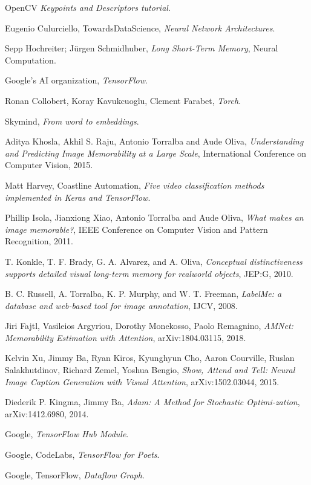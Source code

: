 \begin{thebibliography}{}
	OpenCV
	\emph{Keypoints and Descriptors tutorial}.


	Eugenio Culurciello, TowardsDataScience,
	\emph{Neural Network Architectures}.

	Sepp Hochreiter; Jürgen Schmidhuber,
	\emph{Long Short-Term Memory},
	Neural Computation.

	Google’s AI organization,
	\emph{TensorFlow}.

	Ronan Collobert, Koray Kavukcuoglu, Clement Farabet,
    \emph{Torch}.

	Skymind,
    \emph{From word to embeddings}.


	Aditya Khosla, Akhil S. Raju, Antonio Torralba and Aude Oliva,
	\emph{Understanding and Predicting Image Memorability at a Large Scale},
	International Conference on Computer Vision,
	2015.

	Matt Harvey, Coastline Automation,
	\emph{Five video classification methods implemented in Keras and TensorFlow}.

	Phillip Isola, Jianxiong Xiao, Antonio Torralba and Aude Oliva,
	\emph{What makes an image memorable?},
	IEEE Conference on Computer Vision and Pattern Recognition,
	2011.

	T. Konkle, T. F. Brady, G. A. Alvarez, and A. Oliva,
	\emph{Conceptual distinctiveness supports detailed visual long-term memory for realworld objects},
	JEP:G, 2010.

	B. C. Russell, A. Torralba, K. P. Murphy, and W. T. Freeman,
	\emph{LabelMe: a database and web-based tool for image annotation},
	IJCV, 2008.


	Jiri Fajtl, Vasileios Argyriou, Dorothy Monekosso, Paolo Remagnino,
	\emph{AMNet: Memorability Estimation with Attention},
	arXiv:1804.03115, 2018.

	Kelvin Xu, Jimmy Ba, Ryan Kiros, Kyunghyun Cho, Aaron Courville, Ruslan Salakhutdinov, Richard Zemel, Yoshua Bengio,
	\emph{Show, Attend and Tell: Neural Image Caption Generation with Visual Attention},
	arXiv:1502.03044, 2015.

	Diederik P. Kingma, Jimmy Ba,
	\emph{Adam: A Method for Stochastic Optimi-zation},
	arXiv:1412.6980, 2014.


	Google,
	\emph{TensorFlow Hub Module}.

	Google, CodeLabs,
	\emph{TensorFlow for Poets}.


	Google, TensorFlow,
	\emph{Dataflow Graph}.

\end{thebibliography}